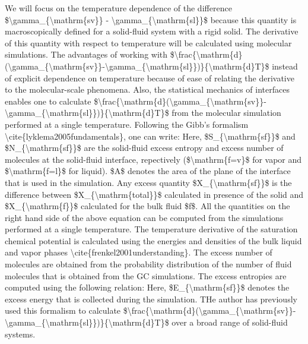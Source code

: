 \par We will focus on the temperature dependence of the difference \$\textbackslash gamma\_\{\textbackslash mathrm\{sv\}\} - \textbackslash gamma\_\{\textbackslash mathrm\{sl\}\}\$ because this quantity is macroscopically defined for a solid-fluid system with a rigid solid. The derivative of this quantity with respect to temperature will be calculated using molecular simulations. The advantages of working with \$\textbackslash frac\{\textbackslash mathrm\{d\}(\textbackslash gamma\_\{\textbackslash mathrm\{sv\}\}-\textbackslash gamma\_\{\textbackslash mathrm\{sl\}\})\}\{\textbackslash mathrm\{d\}T\}\$ instead of explicit dependence on temperature because of ease of relating the derivative to the molecular-scale phenomena. Also, the statistical mechanics of interfaces enables one to calculate \$\textbackslash frac\{\textbackslash mathrm\{d\}(\textbackslash gamma\_\{\textbackslash mathrm\{sv\}\}-\textbackslash gamma\_\{\textbackslash mathrm\{sl\}\})\}\{\textbackslash mathrm\{d\}T\}\$ from the molecular simulation performed at a single temperature. Following the Gibb's formalism \textbackslash cite\{lyklema2005fundamentals\}, one can write: Here, \$S\_\{\textbackslash mathrm\{sf\}\}\$ and \$N\_\{\textbackslash mathrm\{sf\}\}\$ are the solid-fluid excess entropy and excess number of molecules at  the solid-fluid interface, repectively (\$\textbackslash mathrm\{f=v\}\$ for vapor and \$\textbackslash mathrm\{f=l\}\$ for liquid). \$A\$ denotes the area of the plane of the interface that is used in the simulation. Any excess quantity \$X\_\{\textbackslash mathrm\{sf\}\}\$ is the difference between \$X\_\{\textbackslash mathrm\{total\}\}\$ calculated in presence of the solid and \$X\_\{\textbackslash mathrm\{f\}\}\$ calculated for the bulk fluid \$f\$. All the quantities on the right hand side of the above equation can be computed from the simulations performed at a single temperature. The temperature derivative of the saturation chemical potential is calculated using the energies and densities of the bulk liquid and vapor phases \textbackslash cite\{frenkel2001understanding\}. The excess number of molecules are obtained from the probability distribution of the number of fluid molecules that is obtained from the GC simulations. The excess entropies are computed using the following relation: Here, \$E\_\{\textbackslash mathrm\{sf\}\}\$ denotes the excess energy that is collected during the simulation. THe author has previously used this formalism to calculate \$\textbackslash frac\{\textbackslash mathrm\{d\}(\textbackslash gamma\_\{\textbackslash mathrm\{sv\}\}-\textbackslash gamma\_\{\textbackslash mathrm\{sl\}\})\}\{\textbackslash mathrm\{d\}T\}\$ over a broad range of solid-fluid systems.
